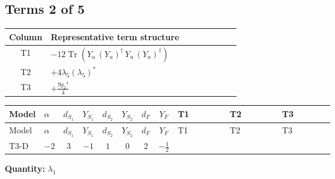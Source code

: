 \documentclass[8pt]{article}
\begin{document}
\begin{landscape}
\subsection*{Terms 2 of 5}
\begin{center}
\begin{tabular}{@{}c >{\raggedright\arraybackslash}p{0.82\linewidth}@{}}
\toprule
Column & Representative term structure \\
\midrule
T1 & \(\displaystyle -12 \operatorname{Tr}\!\left({Y_u}\,\left({Y_u}\right)^{\dagger}\,{Y_u}\,\left({Y_u}\right)^{\dagger}\right)\) \\
\midrule
T2 & \(\displaystyle +4 {\lambda_5} \left({\lambda_5}\right)^{*}\) \\
\midrule
T3 & \(\displaystyle +\frac{9 {g_2}^4}{4}\) \\
\midrule
\bottomrule
\end{tabular}
\end{center}
\smallskip
\tiny
\begin{longtable}{@{}llcccccc >{\raggedright\arraybackslash}p{0.21\linewidth} >{\raggedright\arraybackslash}p{0.21\linewidth} >{\raggedright\arraybackslash}p{0.21\linewidth}@{}}
\toprule
Model & $\alpha$ & $d_{S_1}$ & $Y_{S_1}$ & $d_{S_2}$ & $Y_{S_2}$ & $d_F$ & $Y_F$ & T1 & T2 & T3 \\
\midrule
\endfirsthead
\toprule
Model & $\alpha$ & $d_{S_1}$ & $Y_{S_1}$ & $d_{S_2}$ & $Y_{S_2}$ & $d_F$ & $Y_F$ & T1 & T2 & T3 \\
\midrule
\endhead
T3-D & $-2$ & $3$ & $-1$ & $1$ & $0$ & $2$ & $-\frac{1}{2}$ & \scriptsize\adjustbox{max width=\linewidth}{$\begin{gathered} -12 \operatorname{Tr}\!\left({Y_u}\,\left({Y_u}\right)^{\dagger}\,{Y_u}\,\left({Y_u}\right)^{\dagger}\right)\end{gathered}$} & \scriptsize\adjustbox{max width=\linewidth}{$\begin{gathered} +4 {\lambda_5} \left({\lambda_5}\right)^{*}\end{gathered}$} & \scriptsize\adjustbox{max width=\linewidth}{$\begin{gathered} +\frac{9 {g_2}^4}{4}\end{gathered}$} \\
\midrule
\bottomrule
\end{longtable}
\clearpage
\noindent\textbf{Quantity: }$\lambda_1$\par\smallskip

\end{landscape}
\end{document}
